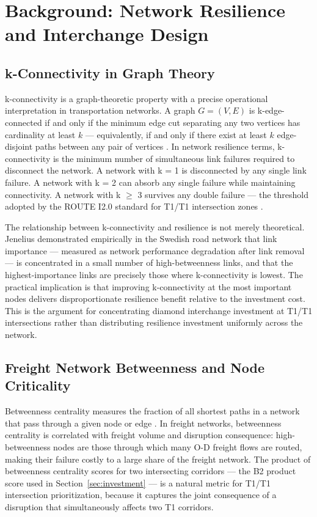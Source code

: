 \section{Background: Network Resilience and Interchange Design}
\label{sec:literature}

\subsection{k-Connectivity in Graph Theory}

k-connectivity is a graph-theoretic property with a precise operational interpretation in transportation networks. A graph $G = (V, E)$ is k-edge-connected if and only if the minimum edge cut separating any two vertices has cardinality at least $k$ --- equivalently, if and only if there exist at least $k$ edge-disjoint paths between any pair of vertices \citep{Menger1927}. In network resilience terms, k-connectivity is the minimum number of simultaneous link failures required to disconnect the network. A network with k = 1 is disconnected by any single link failure. A network with k = 2 can absorb any single failure while maintaining connectivity. A network with k $\geq$ 3 survives any double failure --- the threshold adopted by the ROUTE I2.0 standard for T1/T1 intersection zones \citep{ROUTE_B4}.

The relationship between k-connectivity and resilience is not merely theoretical. Jenelius \citep{Jenelius2010} demonstrated empirically in the Swedish road network that link importance --- measured as network performance degradation after link removal --- is concentrated in a small number of high-betweenness links, and that the highest-importance links are precisely those where k-connectivity is lowest. The practical implication is that improving k-connectivity at the most important nodes delivers disproportionate resilience benefit relative to the investment cost. This is the argument for concentrating diamond interchange investment at T1/T1 intersections rather than distributing resilience investment uniformly across the network.

\subsection{Freight Network Betweenness and Node Criticality}

Betweenness centrality measures the fraction of all shortest paths in a network that pass through a given node or edge \citep{Brandes2001}. In freight networks, betweenness centrality is correlated with freight volume and disruption consequence: high-betweenness nodes are those through which many O-D freight flows are routed, making their failure costly to a large share of the freight network. The product of betweenness centrality scores for two intersecting corridors --- the B2 product score used in Section~\ref{sec:investment} --- is a natural metric for T1/T1 intersection prioritization, because it captures the joint consequence of a disruption that simultaneously affects two T1 corridors.

